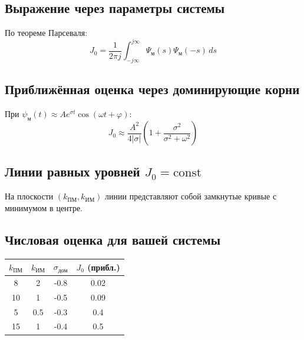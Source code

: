 \documentclass[14pt]{extreport}
\begin{document}
{\subsection*{Выражение через параметры системы}
По теореме Парсеваля:
\[
J_0 = \frac{1}{2\pi j} \int_{-j\infty}^{j\infty} \Psi_{\text{м}}(s) \Psi_{\text{м}}(-s) \, ds
\]

\subsection*{Приближённая оценка через доминирующие корни}
При $\psi_{\text{м}}(t) \approx A e^{\sigma t} \cos(\omega t + \varphi)$:
\[
J_0 \approx \frac{A^2}{4|\sigma|} \left(1 + \frac{\sigma^2}{\sigma^2 + \omega^2}\right)
\]

\subsection*{Линии равных уровней $J_0 = \text{const}$}
На плоскости $(k_{\text{ПМ}}, k_{\text{ИМ}})$ линии представляют собой замкнутые кривые с минимумом в центре.

\begin{center}
\end{center}

\subsection*{Числовая оценка для вашей системы}
\begin{table}[h]
\centering
\begin{tabular}{|c|c|c|c|}
\hline
$k_{\text{ПМ}}$ & $k_{\text{ИМ}}$ & $\sigma_{\text{дом}}$ & $J_0$ (прибл.) \\
\hline
8 & 2 & -0.8 & 0.02 \\
10 & 1 & -0.5 & 0.09 \\
5 & 0.5 & -0.3 & 0.4 \\
15 & 1 & -0.4 & 0.5 \\
\hline
\end{tabular}
\end{table}

}
\end{document}
